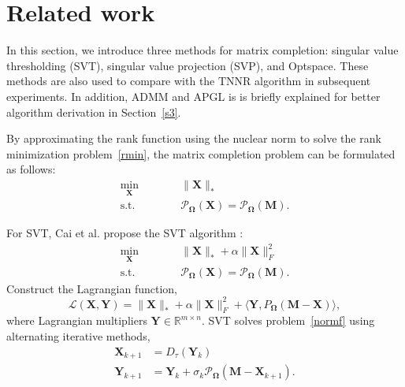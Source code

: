 \documentclass[fontset=windows]{article}
\begin{document}
{\section{Related work}
\label{s2}


In this section, we introduce three methods for matrix completion: singular value thresholding (SVT)\cite{cai.shen200810},  singular value projection (SVP)\cite{jain.dhillon2010}, and Optspace\cite{keshavan.montanari200906}. These methods are also used to compare with the TNNR algorithm in subsequent experiments. In addition, ADMM and APGL is is briefly explained for better algorithm derivation in Section~\ref{s3}.

By approximating the rank function using the nuclear norm to solve the rank
minimization problem~\eqref{rmin},  the matrix completion problem can be formulated\cite{fazel2002matrix} as follows:
\begin{equation}
    \begin{aligned}
        \min_{\mathbf X}\qquad&\quad \lVert\mathbf X\rVert_* \\
        \text{s.t.}\qquad&\quad  \mathcal{P}_{\mathbf \Omega}(\mathbf X) =  \mathcal{P}_{\mathbf\Omega}(\mathbf M).
    \end{aligned}
    \label{normf}
\end{equation}

For SVT, Cai et al. propose the SVT algorithm :
\begin{equation}
    \begin{aligned}
        \min_{\mathbf X}\qquad&\quad \lVert\mathbf X\rVert_* + \alpha\lVert \mathbf X\rVert_F^2\\
        \text{s.t.}\qquad&\quad\mathcal{P}_{\mathbf\Omega}(\mathbf X) =  \mathcal{P}_{\mathbf\Omega}(\mathbf M).
    \end{aligned}
\end{equation}
Construct the Lagrangian function,
\begin{equation}
    \mathcal{L}(\mathbf X,\mathbf Y) = \lVert\mathbf X\rVert_* + \alpha\lVert \mathbf X\rVert_F^2 + \langle \mathbf Y, P_{\mathbf\Omega}(\mathbf M-\mathbf X) \rangle,
\end{equation}
where Lagrangian multipliers $\mathbf Y \in \mathbb{R}^{m \times n}$. SVT solves problem~\eqref{normf} using alternating iterative methods,
\begin{equation}
    \begin{aligned}
        \mathbf X_{k+1} & = D_\tau(\mathbf Y_{k})\\
        \mathbf Y_{k+1}& = \mathbf Y_{k} + \sigma_k\mathcal{P}_{\mathbf\Omega}(\mathbf M-\mathbf X_{k+1}).
    \end{aligned}
\end{equation}

}
\end{document}
